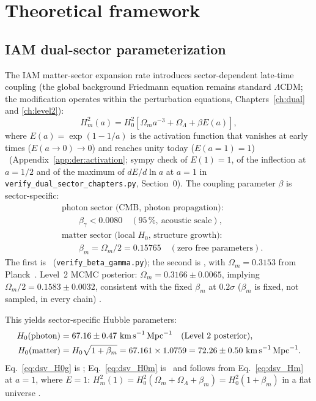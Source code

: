 \section{Theoretical framework}\label{sec:dsv_framework}
\subsection{IAM dual-sector parameterization}
The IAM matter-sector expansion rate introduces sector-dependent late-time coupling (the global background Friedmann equation remains standard
$\Lambda$CDM; the modification operates within the perturbation equations, Chapters~\ref{ch:dual} and \ref{ch:level2}):
\begin{equation}
H_m^2(a)=H_0^2\left[\Omega_ma^{-3}+\Omega_\Lambda+\beta E(a)\right],
\label{eq:dsv_Hm}
\end{equation}
where $E(a)=\exp(1-1/a)$ is the activation function that vanishes at early times ($E(a\to0)\to0$) and reaches unity today ($E(a=1)=1$) \derived\
(Appendix~\ref{app:der:activation}; sympy check of $E(1)=1$, of the inflection at $a=1/2$ and of the maximum of $dE/d\ln a$ at $a=1$ in
\texttt{verify\_dual\_sector\_chapters.py}, Section~0). The coupling parameter $\beta$ is sector-specific:
\begin{align}
&\text{photon sector (CMB, photon propagation):}\nonumber\\&\qquad\beta_\gamma<0.0080\quad(95\,\%,\ \text{acoustic scale}), \label{eq:dsv_bg}\\
&\text{matter sector (local $H_0$, structure growth):}\nonumber\\&\qquad\beta_m=\Omega_m/2=0.15765\quad(\text{zero free parameters}). \label{eq:dsv_bm}
\end{align}
The first is \calc\ (\texttt{verify\_beta\_gamma.py}); the second is \prediction, with $\Omega_m=0.3153$ from Planck~\cite{Planck2018VI}.
Level~2 MCMC posterior: $\Omega_m=0.3166\pm0.0065$, implying $\Omega_m/2=0.1583\pm0.0032$, consistent with the fixed $\beta_m$ at $0.2\sigma$ ($\beta_m$
is fixed, not sampled, in every chain) \calc.

This yields sector-specific Hubble parameters:
\begin{align}
H_0(\text{photon})&=67.16\pm0.47\ \text{km\,s}^{-1}\,\text{Mpc}^{-1}\quad\text{(Level 2 posterior)}, \label{eq:dsv_H0g}\\
H_0(\text{matter})&=H_0\sqrt{1+\beta_m}=67.161\times1.0759=72.26\pm0.50\ \text{km\,s}^{-1}\,\text{Mpc}^{-1}. \label{eq:dsv_H0m}
\end{align}
Eq.~\eqref{eq:dsv_H0g} is \measured; Eq.~\eqref{eq:dsv_H0m} is \calc\ and follows from Eq.~\eqref{eq:dsv_Hm} at $a=1$, where $E=1$:
$H_m^2(1)=H_0^2(\Omega_m+\Omega_\Lambda+\beta_m)=H_0^2(1+\beta_m)$ in a flat universe \derived.

